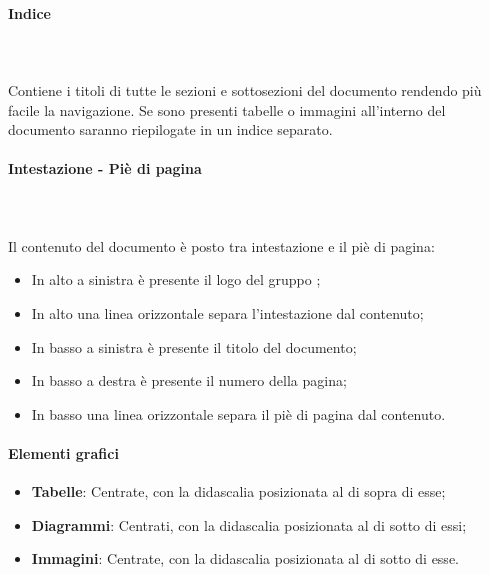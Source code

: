 \paragraph{Indice}\mbox{} \\ \\
Contiene i titoli di tutte le sezioni e sottosezioni del documento rendendo più facile la navigazione.
Se sono presenti tabelle o immagini all'interno del documento saranno riepilogate in un indice separato.

\paragraph{Intestazione - Piè di pagina} \mbox{} \\ \\
Il contenuto del documento è posto tra intestazione e il piè di pagina:

\begin{itemize}
\item In alto a sinistra è presente il logo del gruppo \Gruppo{};
\item In alto una linea orizzontale separa l’intestazione dal contenuto;
\item In basso a sinistra è presente il titolo del documento;
\item In basso a destra è presente il numero della pagina;
\item In basso una linea orizzontale separa il piè di pagina dal contenuto.
\end{itemize}

\paragraph{Elementi grafici}\mbox{}
\begin{itemize}
\item \textbf{Tabelle}: Centrate, con la didascalia posizionata al di sopra di esse;
\item \textbf{Diagrammi}: Centrati, con la didascalia posizionata al di sotto di essi;
\item \textbf{Immagini}: Centrate, con la didascalia posizionata al di sotto di esse.
\end{itemize}

